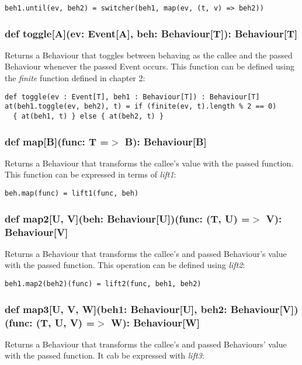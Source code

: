 \begin{verbatim}
beh1.until(ev, beh2) = switcher(beh1, map(ev, (t, v) => beh2))
\end{verbatim}      
      
    \subsubsection*{def toggle[A](ev: Event[A], beh: Behaviour[T]): Behaviour[T]}
      Returns a Behaviour that toggles between behaving as the callee
      and the passed Behaviour whenever the passed Event occurs. This function
      can be defined using the \emph{finite} function defined in chapter 2:

\begin{verbatim}      
def toggle(ev : Event[T], beh1 : Behaviour[T]) : Behaviour[T]
at(beh1.toggle(ev, beh2), t) = if (finite(ev, t).length % 2 == 0)
  { at(beh1, t) } else { at(beh2, t) }
\end{verbatim}

    \subsubsection*{def map[B](func: T =$>$ B): Behaviour[B]}
      Returns a Behaviour that transforms the callee's
      value with the passed function.
      This function can be expressed in terms of \emph{lift1}:

\begin{verbatim}
beh.map(func) = lift1(func, beh)
\end{verbatim}      
      
    \subsubsection*{def map2[U, V](beh: Behaviour[U])(func: (T, U) =$>$ V): Behaviour[V]}
      Returns a Behaviour that transforms the callee's
      and passed Behaviour's value with the passed function. This operation
      can be defined using \emph{lift2}:

\begin{verbatim}
beh1.map2(beh2)(func) = lift2(func, beh1, beh2)
\end{verbatim}      

    \subsubsection*{def map3[U, V, W](beh1: Behaviour[U], beh2: Behaviour[V])(func: (T, U, V) =$>$ W): Behaviour[W]}
      Returns a Behaviour that transforms the callee's
      and passed Behaviours' value with the passed function. It cab
      be expressed with \emph{lift3}:

